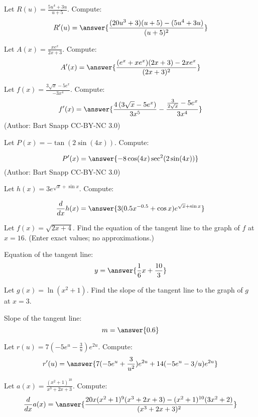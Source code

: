 \documentclass{ximera}
\begin{document}
 
 
   \begin{problem}\label{prob:240hom4prob10}
Let $R(u) = \frac{ 5 u^4+3 u}{u+5}$. Compute:
\[
R'(u)
=\answer{\frac{(20u^3+3)(u+5)-(5u^4+3u)}{(u+5)^2}}
\]

 \end{problem}
 
 \begin{problem}\label{prob:240hom4prob8}
Let $A(x) = \frac{x e^x}{2x+3}$. Compute:
\[
A'(x)
=\answer{\frac{(e^x+xe^x)(2x+3)-2xe^x}{(2x+3)^2}}
\]

 \end{problem}
 
 \begin{problem}\label{prob:240hom4prob11}
Let $f(x) = \frac{ 3 \sqrt{x }-5 e^{x }}{-3 x ^4}$. Compute:
\[
f'(x)
=\answer{\frac{4 \left(3 \sqrt{x }-5 e^{x }\right)}{3 x ^5}-\frac{\frac{3}{2 \sqrt{x }}-5 e^{x }}{3 x ^4}}
\]
(Author: Bart Snapp CC-BY-NC 3.0)
 \end{problem}
 

 \begin{problem}\label{prob:240hom4prob13}
Let $P(x) = -\tan (2 \sin (4 x))$. Compute:

\[
P'(x)
=\answer{-8 \cos (4 x) \sec ^2(2 \sin (4 x))}
\]
(Author: Bart Snapp CC-BY-NC 3.0)
 \end{problem}
 
 
  \begin{problem}\label{prob:240hom4prob16}
Let $h(x) = 3e^{\sqrt{x}+\sin x}$. Compute:

\[
\frac{d}{dx}h(x)
=\answer{3(0.5x^{-0.5}+\cos x)e^{\sqrt{x}+\sin x}}
\]

 \end{problem}
 
 \begin{problem}\label{prob:240hom4prob17}
Let $f(x)=\sqrt{2x+4}$.  Find the equation of the tangent line to the graph of $f$ at $x=16$.  (Enter exact values; no approximations.)

Equation of the tangent line:
$$y=\answer{\frac{1}{6}x+\frac{10}{3}}$$

 \end{problem}
 
 \begin{problem}\label{prob:240hom4prob18}
Let $g(x)=\ln{(x^2+1)}$.  Find the slope of the tangent line to the graph of $g$ at $x=3$.  

Slope of the tangent line:
$$m=\answer{0.6}$$

 \end{problem}
 
 
  \begin{problem}\label{prob:240hom4prob7}
Let $r(u) = 7 \left(-5 e^u-\frac{3}{u}\right) e^{2u}$. Compute:
\[
r'(u)
=\answer{7(-5e^u+\frac{3}{u^2})e^{2u}+14(-5e^u-3/u)e^{2u}}
\]

 \end{problem}
 
 \begin{problem}\label{prob:240hom4prob9}
Let $a(x) = \frac{(x^2+1)^{10}}{x^3+2x+3}$. Compute:
\[
\frac{d}{dx}a(x)
=\answer{\frac{20x(x^2+1)^9(x^3+2x+3)-(x^2+1)^{10}(3x^2+2)}{(x^3+2x+3)^2}}
\]

 \end{problem}
 
\end{document}
